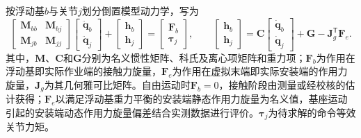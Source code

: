 按浮动基$b$与关节$j$划分倒置模型动力学，写为
\begin{equation}
 \begin{bmatrix}\bm M_{bb}&\bm M_{bj}\\\bm M_{jb}&\bm M_{jj}\end{bmatrix}
 \begin{bmatrix}\ddot{\bm q}_b\\\ddot{\bm q}_j\end{bmatrix}
 +\begin{bmatrix}\bm h_b\\\bm h_j\end{bmatrix}
 =\begin{bmatrix}\bm F_b\\\bm\tau_j\end{bmatrix},
 \qquad
 \begin{bmatrix}\bm h_b\\\bm h_j\end{bmatrix}
 =\bm C\begin{bmatrix}\dot{\bm q}_b\\\dot{\bm q}_j\end{bmatrix}
  +\bm G-\bm J_g^{\mathsf T}\bm F_e .
\label{eq:partitioned_dynamics}
\end{equation}
其中，$\bm M$、$\bm C$和$\bm G$分别为名义惯性矩阵、科氏及离心项矩阵和重力项；$\bm F_b$为作用在浮动基即实际作业端的接触力旋量，$\bm F_e$为作用在虚拟末端即实际安装端的作用力旋量，$\bm J_g$为其几何雅可比矩阵。自由运动时$\bm F_b=0$，接触阶段由测量或经校核的估计获得；$\bm F_e$以满足浮动基重力平衡的安装端静态作用力旋量为名义值，基座运动引起的安装端动态作用力旋量偏差结合实测数据进行评价。$\bm\tau_j$为待求解的命令等效关节力矩。

